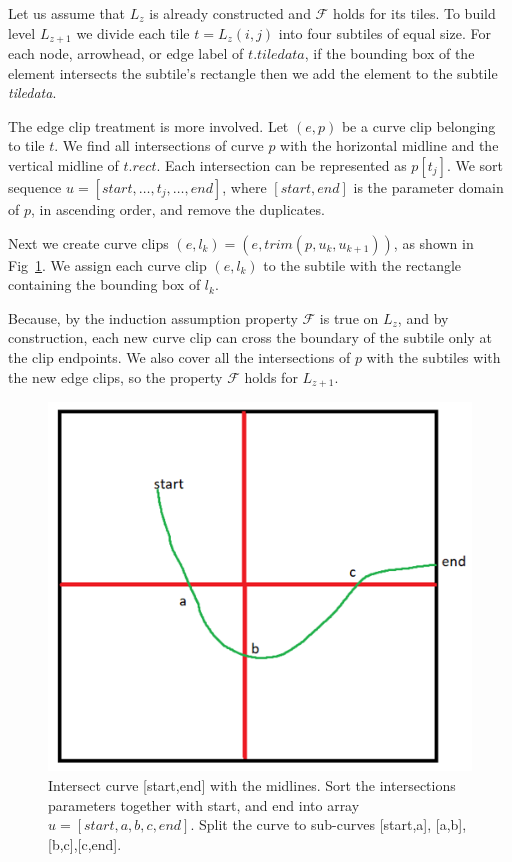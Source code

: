 \documentclass{gd-llncs}
\begin{document}
{Let us assume that $L_z$ is already constructed and $\mathcal{F}$ holds for its tiles. To build level $L_{z+1}$ we divide each tile $t=L_z(i, j)$ into four subtiles of equal size. For each node, arrowhead, or edge label of $t.\textit{tiledata}$, if the bounding box of the element intersects the subtile's rectangle then we add the element to the subtile \textit{tiledata}.

The edge clip treatment is more involved. Let $(e, p)$ be a curve clip belonging to tile $t$. We find all intersections of curve $p$ with the horizontal midline and the vertical midline of $t.\textit{rect}$. Each intersection can be represented as $p[t_j]$. We sort sequence $u =[start, \dots, t_j, \dots, end]$, where $[start,end]$ is the parameter domain of $p$, in ascending order, and remove the duplicates.

Next we create curve clips $(e, l_k)=(e, \textit{trim}(p, u_k, u_{k+1}))$, as shown in Fig~\ref{fig:clip}. We assign each curve clip $(e,l_k)$ to the subtile with the rectangle containing the bounding box of $l_k$.

Because, by the induction assumption property $\mathcal{F}$ is true on $L_z$, and by construction, each new curve clip can cross the boundary of the subtile only at the clip endpoints. We also cover all the intersections of $p$ with the subtiles with the new edge clips, so the property $\mathcal{F}$ holds for $L_{z+1}$.
\begin{figure}[!tbp]
  \centering
  \includegraphics[width=\textwidth/2]{./edge_clips.png}
  \caption{Intersect curve [start,end] with the midlines.
  Sort the intersections parameters together with start, and end into array $u = [start, a,b,c, end]$. Split the curve to sub-curves [start,a], [a,b],[b,c],[c,end].}
  \label{fig:clip}
\end{figure}

}
\end{document}
